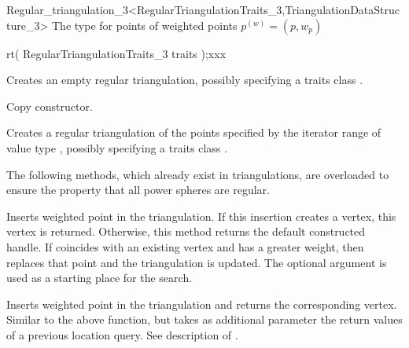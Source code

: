 \begin{ccRefClass}{Regular_triangulation_3<RegularTriangulationTraits_3,TriangulationDataStructure_3>}
{The type for points
 of weighted points ${p}^{(w)}=(p,w_p)$}
\ccGlue
{}

\ccCreation
{}


{rt( RegularTriangulationTraits_3 traits );xxx}{}

{Creates an empty regular triangulation, possibly specifying a traits class
.}

 {Copy constructor.}

{Creates a regular triangulation of the points specified by the iterator range
\ccc{[first,last)} of value type , possibly specifying a
traits class .}

\ccOperations



The following methods, which already exist in triangulations, are
overloaded to ensure the property that all power spheres are regular.

{Inserts weighted point  in the triangulation. If this
insertion creates a vertex, this vertex is returned. Otherwise, this
method returns the default constructed handle.  If  coincides with an
existing vertex and has a greater weight, then  replaces that point and
the triangulation is updated.  The optional argument  is used as a
starting place for the search.}

{Inserts weighted point  in the triangulation and returns the corresponding
 vertex. Similar to the above  function, but takes as additional
 parameter the return values of a previous location query.  See description of
 .}


\end{ccRefClass}
